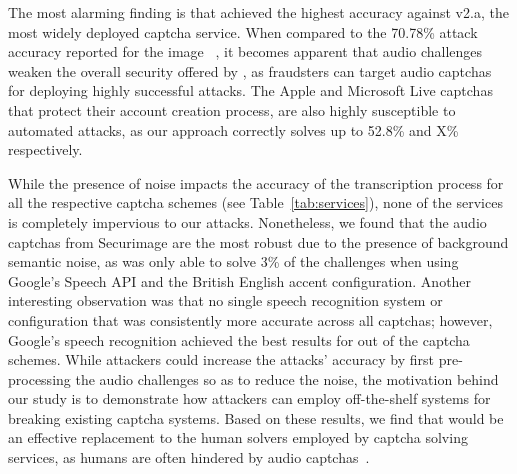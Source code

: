 The most alarming finding is 
that \system achieved the highest accuracy against \re v2.a, the most widely deployed captcha service. When compared 
to the 70.78\% attack accuracy reported for the image \re~\cite{sivakorn:eurosp16}, it becomes apparent that audio challenges
weaken the overall security offered by \re, as fraudsters can target audio captchas for deploying highly successful
attacks. The Apple and Microsoft Live captchas that protect their account creation process, are also highly susceptible to 
automated attacks, as our approach correctly solves up to 52.8\% and X\% respectively.

While the presence of noise impacts the accuracy of the transcription process for all the respective captcha schemes
(see Table~\ref{tab:services}), none of the services is completely impervious to our attacks. Nonetheless, we
found that the audio captchas from Securimage are the most robust due to the presence of background semantic noise,
as \system was only able to solve 3\% of the challenges when using Google's Speech API and the British English accent
configuration. Another interesting observation was that no single speech recognition system or configuration that 
was consistently more accurate across all captchas; however, Google's speech recognition achieved the best
results for  out of the  captcha schemes. While attackers could increase the attacks' accuracy
by first pre-processing the audio challenges so as to reduce the noise, the motivation behind our study is to 
demonstrate how attackers can employ off-the-shelf systems for breaking existing captcha systems.
Based on these results, we find that \system would be an effective replacement to the human solvers employed by
captcha solving services, as humans are often hindered by audio captchas~\cite{captchas-are-hard}.


